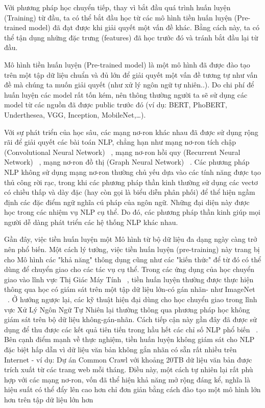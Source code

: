 \documentclass[conference]{IEEEtran}
\begin{document}
Với phương pháp học chuyển tiếp, thay vì bắt đầu quá trình huấn luyện (Training) từ đầu, ta có thể bắt đầu học từ các mô hình tiền huấn luyện (Pre-trained model) đã đạt được khi giải quyết một vấn đề khác. Bằng cách này, ta có thể tận dụng những đặc trưng (features) đã học trước đó và tránh bắt đầu lại từ đầu.

Mô hình tiền huấn luyện (Pre-trained model) là một mô hình đã được đào tạo trên một tập dữ liệu chuẩn và đủ lớn để giải quyết một vấn đề tương tự như vấn đề mà chúng ta muốn giải quyết (như xử lý ngôn ngữ tự nhiên..). Do chi phí để huấn luyện các model rất tốn kém, nên thông thường người ta sẽ sử dụng các model từ các nguồn đã được public trước đó (ví dụ: BERT, PhoBERT, Underthesea, VGG, Inception, MobileNet,…).

Với sự phát triển của học sâu, các mạng nơ-ron khác nhau đã được sử dụng rộng rãi để giải quyết các bài toán NLP, chẳng hạn như mạng nơ-ron tích chập (Convolutional Neural Network) ~\cite{gehring2017convolutional, kalchbrenner-etal-2014-convolutional, kim-2014-convolutional}, mạng nơ-ron hồi quy (Recurrent Neural Network) ~\cite{sutskever-2014-sequence, liu-2016-recurrent}, mạng nơ-ron đồ thị (Graph Neural Network) ~\cite{socher-2013-recursivedeep, tai2015improved, marcheggiani2018exploiting}. Các phương pháp NLP không sử dụng mạng nơ-ron thường chủ yếu dựa vào các tính năng được tạo thủ công rời rạc, trong khi các phương pháp thần kinh thường sử dụng các vectơ có chiều thấp và dày đặc (hay còn gọi là biểu diễn phân phối) để thể hiện ngầm định các đặc điểm ngữ nghĩa cú pháp của ngôn ngữ. Những đại diện này được học trong các nhiệm vụ NLP cụ thể. Do đó, các phương pháp thần kinh giúp mọi người dễ dàng phát triển các hệ thống NLP khác nhau.

Gần đây,  việc tiền huấn luyện một Mô hình từ bộ dữ liệu đa dạng ngày càng trở nên phổ biến.  Một cách lý tưởng,  việc tiền huấn luyện (pre-training) này trang bị cho Mô hình các "khả năng" thông dụng cũng như các "kiến thức" để từ đó có thể dùng để chuyển giao cho các tác vụ cụ thể. Trong các ứng dụng của học chuyển giao vào lĩnh vực Thị Giác Máy Tính ~\cite{oquab2014learning, thrun2004advances, minyoung2016ImageNet}, tiền huấn luyện thường được thực hiện thông qua học có giám sát trên một tập dữ liệu lớn-có gán nhãn- như ImageNet ~\cite{Deng2009ImageNet, Russakovsky2015ImageNet}. Ở hướng ngược lại,  các  kỹ thuật hiện đại dùng cho học chuyển giao trong lĩnh vực Xử Lý Ngôn Ngữ Tự Nhiên lại thường thông qua  phương pháp học không giám sát trên bộ dữ liệu không-gán-nhãn.  Cách tiếp cận này gần đây đã được sử dụng để thu được các kết quả tiên tiến trong hầu hết các chỉ số NLP phổ biến ~\cite{kentonbert, dong2019unified,  liu2019roberta}.  Bên cạnh điểm mạnh về thực nghiệm,  tiền huấn luyện không giám sát cho NLP đặc biệt hấp dẫn vì dữ liệu văn bản không gắn nhãn có sẵn rất nhiều trên Internet - ví dụ: Dự án Common Crawl với khoảng 20TB dữ liệu văn bản được trích xuất từ các trang web mỗi tháng.  Điều này, một cách tự nhiên lại rất phù hợp với các mạng nơ-ron,  vốn đã thể hiện khả năng mở rộng đáng kể,  nghĩa là hiệu suất có thể đẩy lên cao  hơn chỉ đơn giản bằng cách đào tạo một mô hình lớn hơn trên tập dữ liệu lớn hơn ~\cite{hestnessdeep, shazeer2017outrageously, jozefowicz2016exploring, mahajan2018exploring, radford2019language}



\end{document}
